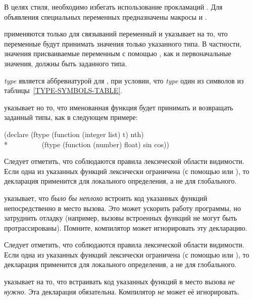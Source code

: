 \begin{flushdesc}
В целях стиля, необходимо избегать использование прокламаций . Для
объявления специальных переменных предназначены макросы  и
.

\item[\cdf{type}]
 применяются только для
связываний переменный и указывает на то, что переменные будут принимать значения
только указанного типа.
В частности, значения присваиваемые переменным с помощью , как и
первоначальные значения, должны быть заданного типа.

\item[\emph{type}]
является аббревиатурой для ,
при условии, что \emph{type} один из символов из таблицы~\ref{TYPE-SYMBOLS-TABLE}.

\item[\cdf{ftype}]
указывает но то, что именованная функция будет принимать и возвращать заданный
типы, как в следующем примере:
\begin{lisp}
(declare (ftype (function (integer list) t) nth) \\*
~~~~~~~~~(ftype (function (number) float) sin cos))
\end{lisp}
Следует отметить, что соблюдаются правила лексической области видимости. Если
одна из указанных функций лексически ограничена (с помощью  или
), то декларация применится для локального определения, а не для глобального.

\item[\cdf{inline}]
  указывает, что \emph{было бы
  неплохо} встроить код указанных функций непосредственно в место вызова.
Это может ускорить работу программы, но затруднить отладку (например, вызовы
встроенных функций не могут быть протрассированы).
Помните, компилятор может игнорировать эту декларацию.

Следует отметить, что соблюдаются правила лексической области видимости. Если
одна из указанных функций лексически ограничена (с помощью  или
), то декларация применится для локального определения, а не для
глобального.

\item[\cdf{notinline}]
указывает на то, что встраивать код указанных функций в место вызова \emph{не
  нужно}.
Эта декларация обязательна.
Компилятор \emph{не} может её игнорировать.


\end{flushdesc}
